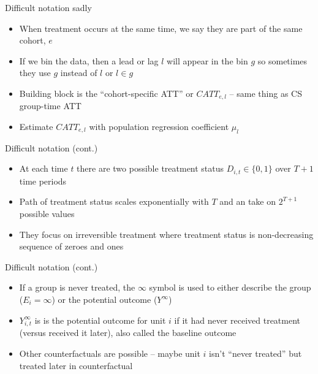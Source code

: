 \documentclass{beamer}
\begin{document}
\begin{frame}{Difficult notation sadly}

\begin{itemize}
\item When treatment occurs at the same time, we say they are part of the same cohort, $e$
\item If we bin the data, then a lead or lag $l$ will appear in the bin $g$ so sometimes they use $g$ instead of $l$ or $l \in g$
\item Building block is the ``cohort-specific ATT'' or $CATT_{e,l}$ -- same thing as CS group-time ATT
\item Estimate $CATT_{e,l}$ with population regression coefficient $\mu_l$
\end{itemize}

\end{frame}


\begin{frame}{Difficult notation (cont.)}

\begin{itemize}
\item At each time $t$ there are two possible treatment status $D_{i,t} \in \{0,1\}$ over $T+1$ time periods
\item Path of treatment status scales exponentially with $T$ and  an take on $2^{T+1}$ possible values
\item They focus on irreversible treatment where treatment status is non-decreasing sequence of zeroes and ones
\end{itemize}

\end{frame}

\begin{frame}{Difficult notation (cont.)}

\begin{itemize}
\item If a group is never treated, the $\infty$ symbol is used to either describe the group ($E_i=\infty$) or the potential outcome ($Y^{\infty}$)
\item $Y^{\infty}_{i,t}$ is is the potential outcome for unit $i$ if it had never received treatment (versus received it later), also called the baseline outcome
\item Other counterfactuals are possible -- maybe unit $i$ isn't ``never treated'' but treated later in counterfactual
\end{itemize}
\end{frame}
\end{document}
